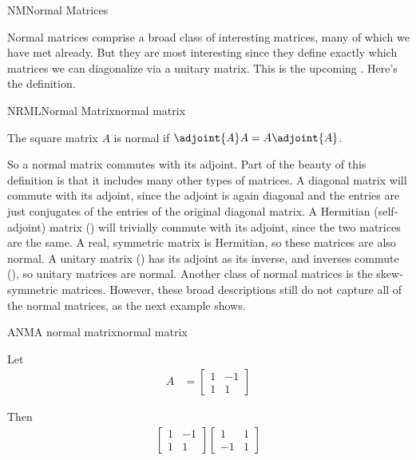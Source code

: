 \begin{subsect}{NM}{Normal Matrices}
%
\begin{para}Normal matrices comprise a broad class of interesting matrices, many of which we have met already.  But they are most interesting since they define exactly which matrices we can diagonalize via a unitary matrix.  This is the upcoming .  Here's the definition.\end{para}
%
\begin{definition}{NRML}{Normal Matrix}{normal matrix}
\begin{para}The square matrix $A$ is normal if $\adjoint{A}A=A\adjoint{A}$.\end{para}
\end{definition}
%
\begin{para}So a normal matrix commutes with its adjoint.  Part of the beauty of this definition is that it includes many other types of matrices.  A diagonal matrix will commute with its adjoint, since the adjoint is again diagonal and the entries are just conjugates of the entries of the original diagonal matrix.  A Hermitian (self-adjoint) matrix () will trivially commute with its adjoint, since the two matrices are the same.  A real, symmetric matrix is Hermitian, so these matrices are also normal.  A unitary matrix () has its adjoint as its inverse, and inverses commute (), so unitary matrices are normal.  Another class of normal matrices is the skew-symmetric matrices.  However, these broad descriptions still do not capture all of the normal matrices, as the next example shows.\end{para}
%
\begin{example}{ANM}{A normal matrix}{normal matrix}
\begin{para}Let
%
\begin{align*}
A&=
\begin{bmatrix}
1 & -1\\1 & 1
\end{bmatrix}
\end{align*}
\end{para}
%
\begin{para}Then
%
\begin{align*}
%
\begin{bmatrix}
1 & -1\\1 & 1
\end{bmatrix}
\begin{bmatrix}
1 & 1\\-1 & 1

\end{bmatrix}
\end{align*}
\end{para}
\end{example}
\end{subsect}
